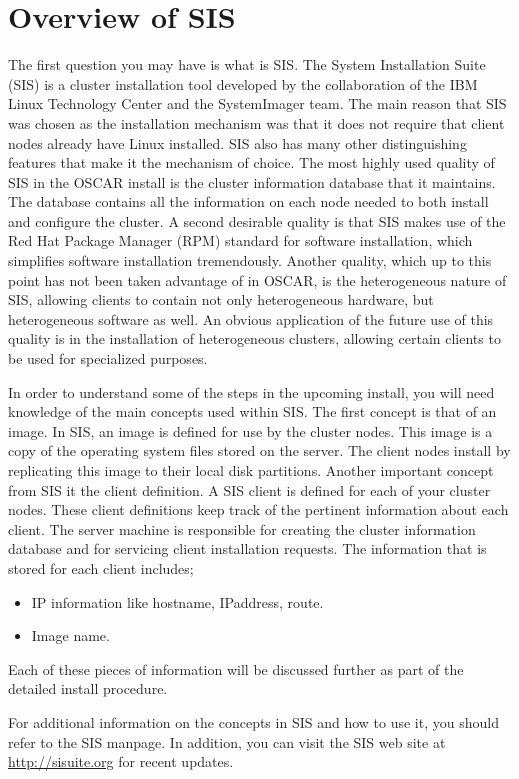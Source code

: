 %
%
%

\section{Overview of SIS}

The first question you may have is what is SIS. The System Installation
Suite (SIS) is a cluster installation tool developed by the collaboration
of the IBM Linux Technology Center and the SystemImager team.
The main reason that SIS was chosen as the
installation mechanism was that it does not require that client nodes
already have Linux installed.
SIS also has many other distinguishing features that make it the mechanism
of choice. The most highly used quality of SIS in the OSCAR install is
the cluster information database that it maintains. The database
contains all the information on each node needed to both install and
configure the cluster. A second desirable quality is that SIS makes
use of the Red Hat Package Manager (RPM) standard for software
installation, which simplifies software installation
tremendously. Another quality, which up to this point has not been
taken advantage of in OSCAR, is the heterogeneous nature of SIS,
allowing clients to contain not only heterogeneous hardware, but
heterogeneous software as well. An obvious application of the future
use of this quality is in the installation of heterogeneous clusters,
allowing certain clients to be used for specialized purposes.

In order to understand some of the steps in the upcoming install, you
will need knowledge of the main concepts used within SIS. The first
concept is that of an image. In SIS, an image is defined for use by
the cluster nodes. This image is a copy of the operating system files 
stored on the server. The client nodes install by replicating this image
to their local disk partitions. Another important concept from SIS it the
client definition.  A SIS client is  defined for each of your cluster nodes. 
These client definitions keep track of the pertinent information about each
client.
The server machine is responsible for creating the cluster
information database and for servicing client installation requests.
The information that is stored for  each client includes;

\begin{itemize}
        \item IP information like hostname, IPaddress, route.
        \item Image name.
\end{itemize}

Each of these pieces of information will be discussed further as part of the
detailed install procedure.

For additional information on the concepts in SIS and how to use it,
you should refer to the SIS manpage. In addition, you can visit the SIS web site at
\url{http://sisuite.org} for recent updates.

